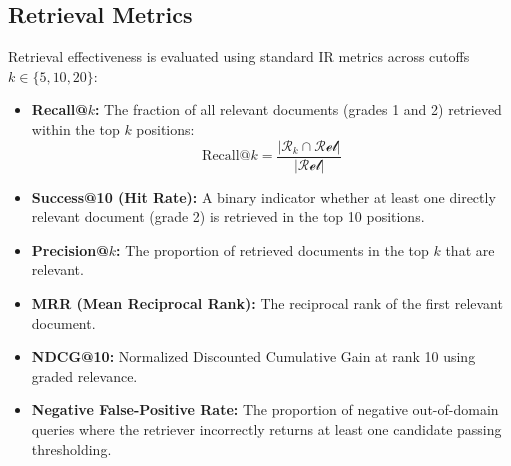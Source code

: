 \documentclass[11pt,a4paper]{article}
\begin{document}
\subsection{Retrieval Metrics}
Retrieval effectiveness is evaluated using standard IR metrics across cutoffs $k \in \{5, 10, 20\}$:
\begin{itemize}
    \item \textbf{Recall@$k$:} The fraction of all relevant documents (grades 1 and 2) retrieved within the top $k$ positions:
    \begin{equation}
        \text{Recall@}k = \frac{|\mathcal{R}_k \cap \mathcal{Rel}|}{|\mathcal{Rel}|}
    \end{equation}
    \item \textbf{Success@10 (Hit Rate):} A binary indicator whether at least one directly relevant document (grade 2) is retrieved in the top 10 positions.
    \item \textbf{Precision@$k$:} The proportion of retrieved documents in the top $k$ that are relevant.
    \item \textbf{MRR (Mean Reciprocal Rank):} The reciprocal rank of the first relevant document.
    \item \textbf{NDCG@10:} Normalized Discounted Cumulative Gain at rank 10 using graded relevance.
    \item \textbf{Negative False-Positive Rate:} The proportion of negative out-of-domain queries where the retriever incorrectly returns at least one candidate passing thresholding.
\end{itemize}
\end{document}

